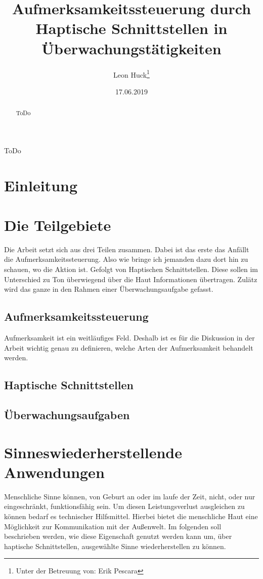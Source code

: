 \documentclass{llncs}					%
\title{Aufmerksamkeitssteuerung durch Haptische Schnittstellen in Überwachungstätigkeiten}
\author{Leon Huck\thanks{Unter der Betreuung von: Erik Pescara}}
\institute{Karlsruher Institut für Technology}
\date{17.06.2019}
\begin{document}
	
\maketitle

\begin{description}
	\item ToDo
\end{description}

\begin{abstract}
	ToDo
\end{abstract}

\newpage
\tableofcontents
\newpage

\newpage
\section{Einleitung}

\section{Die Teilgebiete}
Die Arbeit setzt sich aus drei Teilen zusammen. Dabei ist das erste das Anfällt die Aufmerksamkeitssteuerung. Also wie bringe ich jemanden dazu dort hin zu schauen, wo die Aktion ist. Gefolgt von Haptischen Schnittstellen. Diese sollen im Unterschied zu Ton überwiegend über die Haut Informationen übertragen. Zulätz wird das ganze in den Rahmen einer Überwachungsaufgabe gefasst.

\subsection{Aufmerksamkeitssteuerung}
Aufmerksamkeit ist ein weitläufiges Feld. Deshalb ist es für die Diskussion in der Arbeit wichtig genau zu definieren, welche Arten der Aufmerksamkeit behandelt werden.
\subsection{Haptische Schnittstellen}
\subsection{Überwachungsaufgaben}

\section{Sinneswiederherstellende Anwendungen}
Menschliche Sinne können, von Geburt an oder im laufe der Zeit, nicht, oder nur eingeschränkt, funktionsfähig sein. Um diesen Leistungsverlust ausgleichen zu können bedarf es technischer Hilfsmittel. Hierbei bietet die menschliche Haut eine Möglichkeit zur Kommunikation mit der Außenwelt. Im folgenden soll beschrieben werden, wie diese Eigenschaft genutzt werden kann um, über haptische Schnittstellen, ausgewählte Sinne wiederherstellen zu können.
\end{document}
